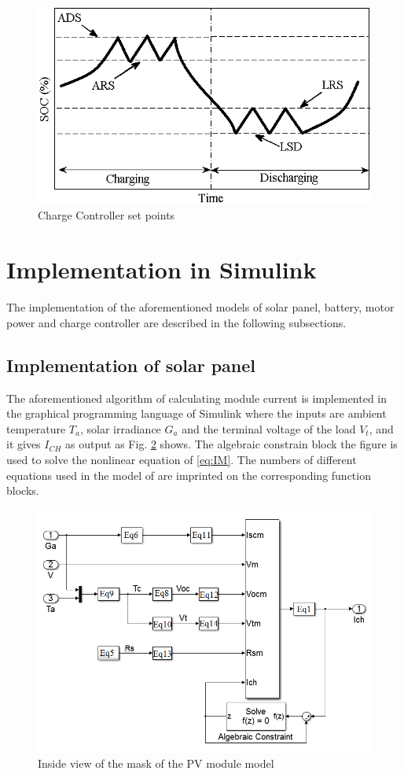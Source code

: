 \documentclass[journal]{IEEEtran/IEEEtran}
\newcommand{\figref}[1]{Fig. \ref{#1}}
\begin{document}
	\begin{figure}[!tb]
		\centering
		\includegraphics[width=\linewidth]{charge_controller_mech.png}
		\caption{Charge Controller set points}
		\label{fig:setpoints}
	\end{figure}
	
	\section{Implementation in Simulink}
	The implementation of the aforementioned models of solar panel, battery, motor power and charge controller are described in the following subsections.
	\subsection{Implementation of solar panel}
	The aforementioned algorithm of calculating module current is implemented in the graphical programming language of Simulink where the inputs are ambient temperature $T_a$, solar irradiance $G_a$ and the terminal voltage  of the load $V_t$, and it gives $I_{CH}$ as output as \figref{fig:panelmask} shows. The algebraic constrain block the figure is used to solve the nonlinear equation of \eqref{eq:IM}. The numbers of different equations used in the model of are imprinted on the corresponding function blocks.
	\begin{figure}[!tb]
		\centering
		\includegraphics[width=\linewidth]{panel_model.png}
		\caption{Inside view of the mask of the PV module model}
		\label{fig:panelmask}
	\end{figure}
\end{document}
